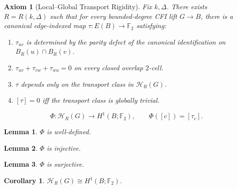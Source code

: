 \documentclass[11pt]{article}
\newtheorem{axiom}{Axiom}
\newtheorem{lemma}{Lemma}
\newtheorem{corollary}{Corollary}
\begin{document}
\begin{axiom}[Local--Global Transport Rigidity]
Fix $k,\Delta$. There exists $R=R(k,\Delta)$ such that for every bounded-degree CFI lift $G\to B$,
there is a canonical edge-indexed map $\tau:E(B)\to \mathbb F_2$ satisfying:
\begin{enumerate}
\item $\tau_{uv}$ is determined by the parity defect of the canonical identification on $B_R(u)\cap B_R(v)$.
\item $\tau_{uv}+\tau_{vw}+\tau_{wu}=0$ on every closed overlap $2$-cell.
\item $\tau$ depends only on the transport class in $\mathcal H_R(G)$.
\item $[\tau]=0$ iff the transport class is globally trivial.
\end{enumerate}
\end{axiom}

\[
\Phi:\mathcal H_R(G)\to H^1(B;\mathbb F_2),\qquad \Phi([c])=[\tau_c].
\]

\begin{lemma}
$\Phi$ is well-defined.
\end{lemma}

\begin{lemma}
$\Phi$ is injective.
\end{lemma}

\begin{lemma}
$\Phi$ is surjective.
\end{lemma}

\begin{corollary}
$\mathcal H_R(G)\cong H^1(B;\mathbb F_2)$.
\end{corollary}
\end{document}
